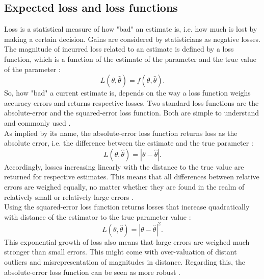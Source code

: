         \subsection{Expected loss and loss functions}\label{sec:loss} 
        Loss is a statistical measure of how "bad" an estimate is, i.e. how much is lost by making a certain decision. Gains are considered by statisticians as negative losses.
        The magnitude of incurred loss related to an estimate is defined by a loss function, which is a function of the estimate of the parameter and the true value of the parameter \citep{wald1950statistical, davidson2015}:        
        \begin{equation}\label{eq:LossFunction}
        L(\theta,\hat{\theta}) = f(\theta,\hat{\theta}).
        \end{equation}        
        So, how "bad" a current estimate is, depends on the way a loss function weighs accuracy errors and returns respective losses. Two standard loss functions are the absolute-error and the squared-error loss function. Both are simple to understand and commonly used \citep{davidson2015}.\\        
        As implied by its name, the absolute-error loss function returns loss as the absolute error, i.e. the difference between the estimate and the true parameter \citep{davidson2015}:        
        \begin{equation}\label{eq:AbsLossFunction}
        L(\theta,\hat{\theta}) = |\theta - \hat{\theta}|.
        \end{equation}                
        Accordingly, losses increasing linearly with the distance to the true value are returned for respective estimates. This means that all differences between relative errors are weighed equally, no matter whether they are found in the realm of relatively small or relatively large errors \citep{hennig2007}.\\
        Using the squared-error loss function returns losses that increase quadratically with distance of the estimator to the true parameter value \citep{davidson2015, moye2006statistical}:        
        \begin{equation}\label{eq:SqrLossFunction}
        L(\theta,\hat{\theta}) = |\theta - \hat{\theta}|^2.
        \end{equation}         
        This exponential growth of loss also means that large errors are weighed much stronger than small errors. This might come with over-valuation of distant outliers and misrepresentation of magnitudes in distance. Regarding this, the absolute-error loss function can be seen as more robust \citep{davidson2015}.
